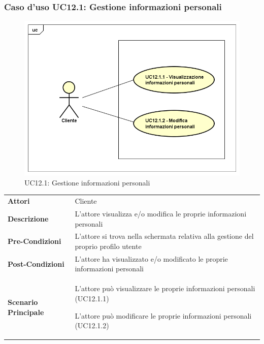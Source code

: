 \newpage
\subsubsection{Caso d'uso UC12.1: Gestione informazioni personali}
\label{UC12_1}
\begin{figure}[ht]
	\centering
	\includegraphics[scale=0.45]{UML/UC12_1.png}
	\caption{UC12.1: Gestione informazioni personali}
\end{figure}

\begin{minipage}{\linewidth}
	\begin{tabular}{ l | p{11cm}}
		\hline
		\rowcolor{Gray}
		\multicolumn{2}{c}{UC12.1 - Gestione informazioni personali} \\
		\hline
		\textbf{Attori} & Cliente \\
		\textbf{Descrizione} & L'attore visualizza e/o modifica le proprie informazioni personali \\
		\textbf{Pre-Condizioni} & L'attore si trova nella schermata relativa alla gestione del proprio profilo utente \\
		\textbf{Post-Condizioni} & L'attore ha visualizzato e/o modificato le proprie informazioni personali \\
		\textbf{Scenario Principale} & 
		\begin{enumerate*}[label=(\arabic*.),itemjoin={\newline}]
			\item L'attore può visualizzare le proprie informazioni personali (UC12.1.1)
			\item L'attore può modificare le proprie informazioni personali (UC12.1.2)
		\end{enumerate*}
	\end{tabular}
\end{minipage}

